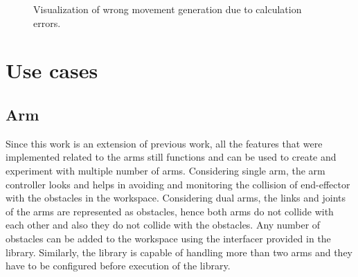 \documentclass[a4paper, 11.5pt, conference]{ieeeconf}      %
\begin{document}
\begin{figure}[H]
	\centering
	\caption{Visualization of wrong movement generation due to calculation errors.}
	\label{fig:robot6}
\end{figure}



\section{Use cases}

\subsection{Arm}
Since this work is an extension of previous work, all the features that were implemented related to the arms still functions and can be used to create and experiment with multiple number of arms. Considering single arm, the arm controller looks and helps in avoiding and monitoring the collision of end-effector with the obstacles in the workspace. Considering dual arms, the links and joints of the arms are represented as obstacles, hence both arms do not collide with each other and also they do not collide with the obstacles. Any number of obstacles can be added to the workspace using the interfacer provided in the library. Similarly, the library is capable of handling more than two arms and they have to be configured before execution of the library.
\end{document}
